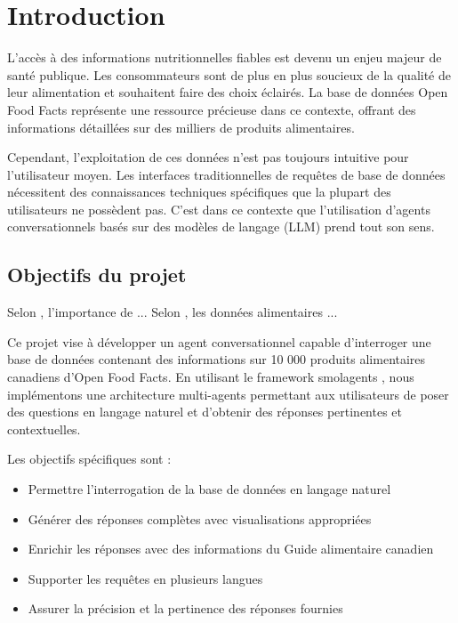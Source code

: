 \chapter{Introduction}

L'accès à des informations nutritionnelles fiables est devenu un enjeu majeur de santé publique. Les consommateurs sont de plus en plus soucieux de la qualité de leur alimentation et souhaitent faire des choix éclairés. La base de données Open Food Facts \cite{openfoodfacts} représente une ressource précieuse dans ce contexte, offrant des informations détaillées sur des milliers de produits alimentaires.

Cependant, l'exploitation de ces données n'est pas toujours intuitive pour l'utilisateur moyen. Les interfaces traditionnelles de requêtes de base de données nécessitent des connaissances techniques spécifiques que la plupart des utilisateurs ne possèdent pas. C'est dans ce contexte que l'utilisation d'agents conversationnels basés sur des modèles de langage (LLM) prend tout son sens.

\section{Objectifs du projet}

Selon \citet{smolagents}, l'importance de ...
Selon \citet{openfoodfacts}, les données alimentaires ...

Ce projet vise à développer un agent conversationnel capable d'interroger une base de données contenant des informations sur 10 000 produits alimentaires canadiens d'Open Food Facts. En utilisant le framework smolagents \cite{smolagents}, nous implémentons une architecture multi-agents permettant aux utilisateurs de poser des questions en langage naturel et d'obtenir des réponses pertinentes et contextuelles.

Les objectifs spécifiques sont :
\begin{itemize}
    \item Permettre l'interrogation de la base de données en langage naturel
    \item Générer des réponses complètes avec visualisations appropriées
    \item Enrichir les réponses avec des informations du Guide alimentaire canadien
    \item Supporter les requêtes en plusieurs langues
    \item Assurer la précision et la pertinence des réponses fournies
\end{itemize}

